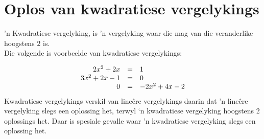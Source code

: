 \section{Oplos van kwadratiese vergelykings}

’n Kwadratiese vergelyking, is ’n vergelyking waar die mag van die veranderlike hoogstens
$2$ is. \\Die volgende is voorbeelde van kwadratiese vergelykings:\par 


\begin{equation*}
    \begin{array}{ccl}\hfill 2{x}^{2}+2x& =& 1\hfill \\
	\hfill 3{x}^{2}+2x-1&=&0 \\ 
	\hfill 0&=&-2{x}^{2}+4x-2\hfill 
    \end{array}
\end{equation*}
Kwadratiese vergelykings verskil van lineêre vergelykings daarin dat ’n lineêre vergelyking slegs een oplossing
het, terwyl ‘n kwadratiese vergelyking hoogstens 2 oplossings het. Daar is spesiale gevalle waar ’n kwadratiese
vergelyking slegs een oplossing het.

